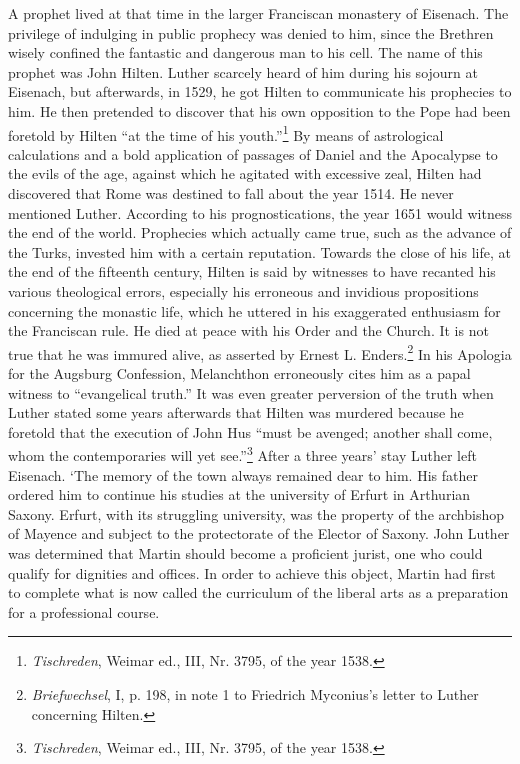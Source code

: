 A prophet lived at that time in the larger Franciscan monastery of
Eisenach. The privilege of indulging in public prophecy was denied
to him, since the Brethren wisely confined the fantastic and dangerous
man to his cell. The name of this prophet was John Hilten. Luther
scarcely heard of him during his sojourn at Eisenach, but afterwards,
in 1529, he got Hilten to communicate his prophecies to him. He
then pretended to discover that his own opposition to the Pope had
been foretold by Hilten “at the time of his youth.”\footnote{\textit{Tischreden}, Weimar ed., III, Nr. 3795, of the year 1538.}
By means of
astrological calculations and a bold application of passages of Daniel
and the Apocalypse to the evils of the age, against which he agitated
with excessive zeal, Hilten had discovered that Rome was destined to
fall about the year 1514. He never mentioned Luther. According to
his prognostications, the year 1651 would witness the end of the
world. Prophecies which actually came true, such as the advance of
the Turks, invested him with a certain reputation. Towards the close
of his life, at the end of the fifteenth century, Hilten is said by witnesses to have recanted his various theological errors, especially his
erroneous and invidious propositions concerning the monastic life,
which he uttered in his exaggerated enthusiasm for the Franciscan
rule. He died at peace with his Order and the Church. It is not true
that he was immured alive, as asserted by Ernest L. Enders.\footnote{\textit{Briefwechsel}, I, p. 198, in note 1 to Friedrich Myconius’s letter to Luther concerning Hilten.}
In his
Apologia for the Augsburg Confession, Melanchthon erroneously
cites him as a papal witness to “evangelical truth.” It was even greater
perversion of the truth when Luther stated some years afterwards
that Hilten was murdered because he foretold that the execution of
John Hus “must be avenged; another shall come, whom the contemporaries will yet see.”\footnote{\textit{Tischreden}, Weimar ed., III, Nr. 3795, of the year 1538.}
After a three years’ stay Luther left Eisenach. ‘The memory of the
town always remained dear to him. His father ordered him to continue his studies at the university of Erfurt in Arthurian Saxony.
Erfurt, with its struggling university, was the property of the archbishop
of Mayence and subject to the protectorate of the Elector of
Saxony. John Luther was determined that Martin should become a
proficient jurist, one who could qualify for dignities and offices. In
order to achieve this object, Martin had first to complete what is now
called the curriculum of the liberal arts as a preparation for a professional course.

